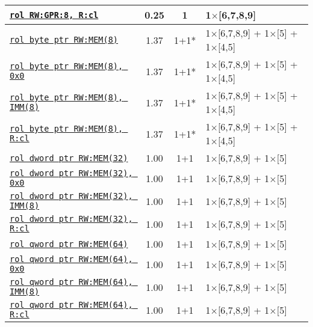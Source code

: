 \documentclass[a4paper,english,fontsize=9]{scrartcl}
\begin{document}
\begin{longtable}{p{}ccL{.25\textwidth}}
  \midrule
  \texttt{\href{https://felixcloutier.com/x86/RCL:RCR:ROL:ROR.html}{rol RW:GPR:8, R:cl}} & 0.25 & 1 & 1\(\times\)[6,7,8,9] \\
  \midrule
  \texttt{\href{https://felixcloutier.com/x86/RCL:RCR:ROL:ROR.html}{rol byte ptr RW:MEM(8)}} & 1.37 & 1+1* & 1\(\times\)[6,7,8,9] + 1\(\times\)[5] + 1\(\times\)[4,5] \\
  \midrule
  \texttt{\href{https://felixcloutier.com/x86/RCL:RCR:ROL:ROR.html}{rol byte ptr RW:MEM(8), 0x0}} & 1.37 & 1+1* & 1\(\times\)[6,7,8,9] + 1\(\times\)[5] + 1\(\times\)[4,5] \\
  \midrule
  \texttt{\href{https://felixcloutier.com/x86/RCL:RCR:ROL:ROR.html}{rol byte ptr RW:MEM(8), IMM(8)}} & 1.37 & 1+1* & 1\(\times\)[6,7,8,9] + 1\(\times\)[5] + 1\(\times\)[4,5] \\
  \midrule
  \texttt{\href{https://felixcloutier.com/x86/RCL:RCR:ROL:ROR.html}{rol byte ptr RW:MEM(8), R:cl}} & 1.37 & 1+1* & 1\(\times\)[6,7,8,9] + 1\(\times\)[5] + 1\(\times\)[4,5] \\
  \midrule
  \texttt{\href{https://felixcloutier.com/x86/RCL:RCR:ROL:ROR.html}{rol dword ptr RW:MEM(32)}} & 1.00 & 1+1 & 1\(\times\)[6,7,8,9] + 1\(\times\)[5] \\
  \midrule
  \texttt{\href{https://felixcloutier.com/x86/RCL:RCR:ROL:ROR.html}{rol dword ptr RW:MEM(32), 0x0}} & 1.00 & 1+1 & 1\(\times\)[6,7,8,9] + 1\(\times\)[5] \\
  \midrule
  \texttt{\href{https://felixcloutier.com/x86/RCL:RCR:ROL:ROR.html}{rol dword ptr RW:MEM(32), IMM(8)}} & 1.00 & 1+1 & 1\(\times\)[6,7,8,9] + 1\(\times\)[5] \\
  \midrule
  \texttt{\href{https://felixcloutier.com/x86/RCL:RCR:ROL:ROR.html}{rol dword ptr RW:MEM(32), R:cl}} & 1.00 & 1+1 & 1\(\times\)[6,7,8,9] + 1\(\times\)[5] \\
  \midrule
  \texttt{\href{https://felixcloutier.com/x86/RCL:RCR:ROL:ROR.html}{rol qword ptr RW:MEM(64)}} & 1.00 & 1+1 & 1\(\times\)[6,7,8,9] + 1\(\times\)[5] \\
  \midrule
  \texttt{\href{https://felixcloutier.com/x86/RCL:RCR:ROL:ROR.html}{rol qword ptr RW:MEM(64), 0x0}} & 1.00 & 1+1 & 1\(\times\)[6,7,8,9] + 1\(\times\)[5] \\
  \midrule
  \texttt{\href{https://felixcloutier.com/x86/RCL:RCR:ROL:ROR.html}{rol qword ptr RW:MEM(64), IMM(8)}} & 1.00 & 1+1 & 1\(\times\)[6,7,8,9] + 1\(\times\)[5] \\
  \midrule
  \texttt{\href{https://felixcloutier.com/x86/RCL:RCR:ROL:ROR.html}{rol qword ptr RW:MEM(64), R:cl}} & 1.00 & 1+1 & 1\(\times\)[6,7,8,9] + 1\(\times\)[5] \\

\end{longtable}
\end{document}
